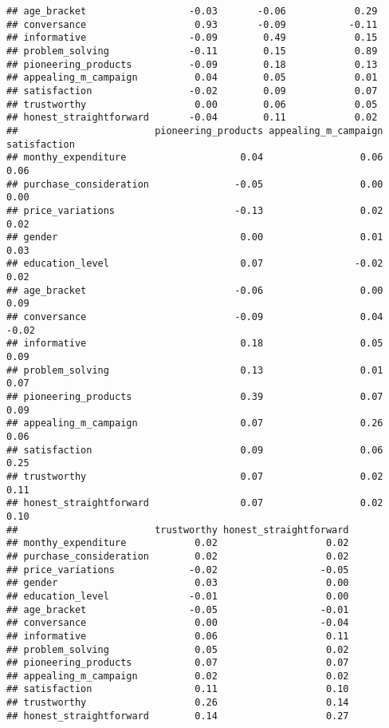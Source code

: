 \documentclass[
]{article}
\begin{document}
\begin{verbatim}
## age_bracket                  -0.03       -0.06            0.29
## conversance                   0.93       -0.09           -0.11
## informative                  -0.09        0.49            0.15
## problem_solving              -0.11        0.15            0.89
## pioneering_products          -0.09        0.18            0.13
## appealing_m_campaign          0.04        0.05            0.01
## satisfaction                 -0.02        0.09            0.07
## trustworthy                   0.00        0.06            0.05
## honest_straightforward       -0.04        0.11            0.02
##                        pioneering_products appealing_m_campaign satisfaction
## monthy_expenditure                    0.04                 0.06         0.06
## purchase_consideration               -0.05                 0.00         0.00
## price_variations                     -0.13                 0.02         0.02
## gender                                0.00                 0.01         0.03
## education_level                       0.07                -0.02         0.02
## age_bracket                          -0.06                 0.00         0.09
## conversance                          -0.09                 0.04        -0.02
## informative                           0.18                 0.05         0.09
## problem_solving                       0.13                 0.01         0.07
## pioneering_products                   0.39                 0.07         0.09
## appealing_m_campaign                  0.07                 0.26         0.06
## satisfaction                          0.09                 0.06         0.25
## trustworthy                           0.07                 0.02         0.11
## honest_straightforward                0.07                 0.02         0.10
##                        trustworthy honest_straightforward
## monthy_expenditure            0.02                   0.02
## purchase_consideration        0.02                   0.02
## price_variations             -0.02                  -0.05
## gender                        0.03                   0.00
## education_level              -0.01                   0.00
## age_bracket                  -0.05                  -0.01
## conversance                   0.00                  -0.04
## informative                   0.06                   0.11
## problem_solving               0.05                   0.02
## pioneering_products           0.07                   0.07
## appealing_m_campaign          0.02                   0.02
## satisfaction                  0.11                   0.10
## trustworthy                   0.26                   0.14
## honest_straightforward        0.14                   0.27
\end{verbatim}
\end{document}
